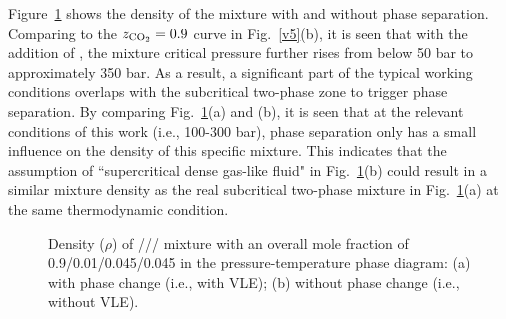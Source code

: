 


     Figure~\ref{fig:PTdiagram_rho} shows the density of the mixture with and without phase separation. Comparing to the $z_{\ce{CO2}}=0.9$ curve in Fig.~\ref{v5}(b), it is seen that with the addition of , the mixture critical pressure further rises from below 50 bar to approximately 350 bar. As a result, a significant part of the typical working conditions overlaps with the subcritical two-phase zone to trigger phase separation. By comparing Fig.~\ref{fig:PTdiagram_rho}(a) and (b), it is seen that at the relevant conditions of this work (i.e., 100-300 bar), phase separation only has a small influence on the density of this specific mixture. This indicates that the assumption of ``supercritical dense gas-like fluid" in Fig.~\ref{fig:PTdiagram_rho}(b) could result in a similar mixture density as the real subcritical two-phase mixture in Fig.~\ref{fig:PTdiagram_rho}(a) at the same thermodynamic condition.

    \begin{figure}[htb]
        \centering


        \caption{Density ($\rho$) of /// mixture with an overall mole fraction of 0.9/0.01/0.045/0.045 in the pressure-temperature phase diagram: (a) with phase change (i.e., with VLE); (b) without phase change (i.e., without VLE).}
        \label{fig:PTdiagram_rho}
    \end{figure}

